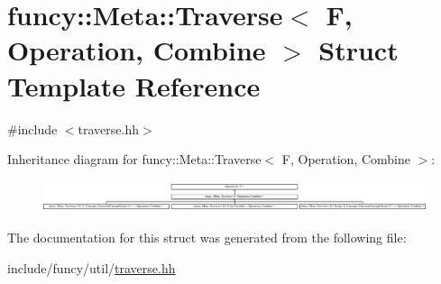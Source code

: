 \hypertarget{structfuncy_1_1Meta_1_1Traverse}{\section{funcy\-:\-:Meta\-:\-:Traverse$<$ F, Operation, Combine $>$ Struct Template Reference}
\label{structfuncy_1_1Meta_1_1Traverse}
}


{\ttfamily \#include $<$traverse.\-hh$>$}

Inheritance diagram for funcy\-:\-:Meta\-:\-:Traverse$<$ F, Operation, Combine $>$\-:\begin{figure}[H]
\begin{center}
\leavevmode
\includegraphics[height=0.919540cm]{structfuncy_1_1Meta_1_1Traverse}
\end{center}
\end{figure}


The documentation for this struct was generated from the following file\-:\begin{DoxyCompactItemize}
\item 
include/funcy/util/\hyperlink{traverse_8hh}{traverse.\-hh}\end{DoxyCompactItemize}
